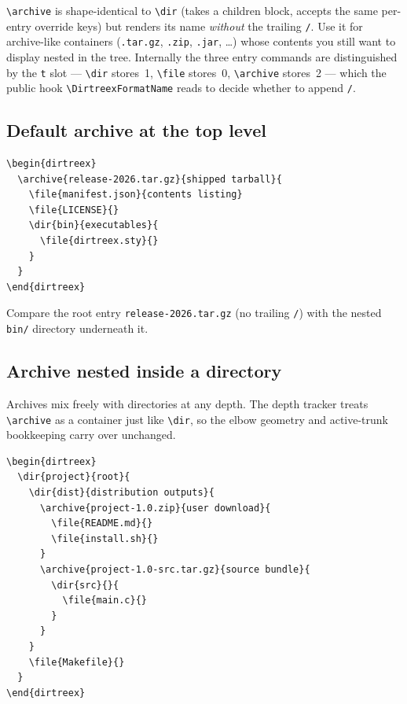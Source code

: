 \documentclass[11pt]{article}
\begin{document}
\verb|\archive| is shape-identical to \verb|\dir| (takes a children block, accepts the same per-entry override keys) but renders its name \emph{without} the trailing \verb|/|. Use it for archive-like containers (\verb|.tar.gz|, \verb|.zip|, \verb|.jar|, \ldots) whose contents you still want to display nested in the tree. Internally the three entry commands are distinguished by the \verb|t| slot --- \verb|\dir| stores~1, \verb|\file| stores~0, \verb|\archive| stores~2 --- which the public hook \verb|\DirtreexFormatName| reads to decide whether to append \verb|/|.

\subsection{Default archive at the top level}

\begin{Verbatim}
\begin{dirtreex}
  \archive{release-2026.tar.gz}{shipped tarball}{
    \file{manifest.json}{contents listing}
    \file{LICENSE}{}
    \dir{bin}{executables}{
      \file{dirtreex.sty}{}
    }
  }
\end{dirtreex}
\end{Verbatim}

\begin{dirtreex}
\end{dirtreex}

Compare the root entry \texttt{release-2026.tar.gz} (no trailing \texttt{/}) with the nested \texttt{bin/} directory underneath it.

\subsection{Archive nested inside a directory}

Archives mix freely with directories at any depth. The depth tracker treats \verb|\archive| as a container just like \verb|\dir|, so the elbow geometry and active-trunk bookkeeping carry over unchanged.

\begin{Verbatim}
\begin{dirtreex}
  \dir{project}{root}{
    \dir{dist}{distribution outputs}{
      \archive{project-1.0.zip}{user download}{
        \file{README.md}{}
        \file{install.sh}{}
      }
      \archive{project-1.0-src.tar.gz}{source bundle}{
        \dir{src}{}{
          \file{main.c}{}
        }
      }
    }
    \file{Makefile}{}
  }
\end{dirtreex}
\end{Verbatim}
\end{document}
